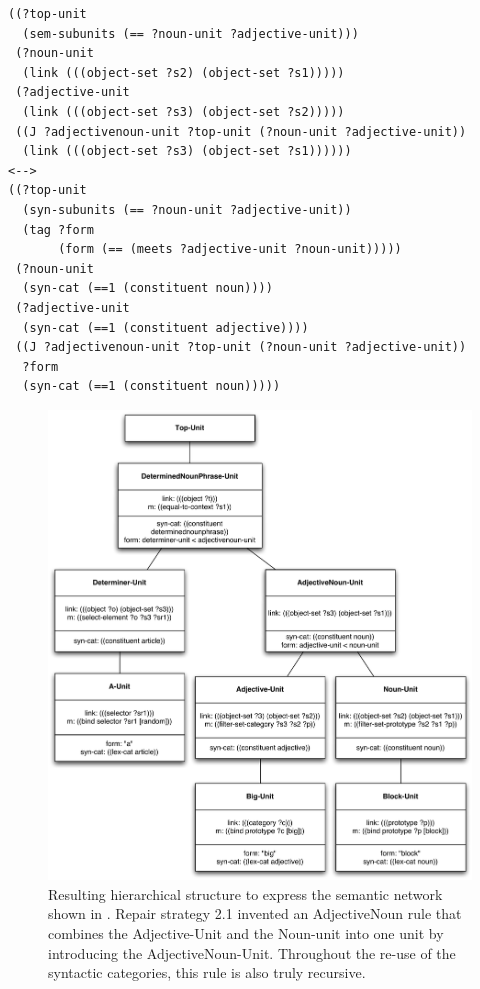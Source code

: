 \footnotesize
{}
\begin{lstlisting}
((?top-unit 
  (sem-subunits (== ?noun-unit ?adjective-unit)))
 (?noun-unit 
  (link (((object-set ?s2) (object-set ?s1)))))
 (?adjective-unit 
  (link (((object-set ?s3) (object-set ?s2)))))
 ((J ?adjectivenoun-unit ?top-unit (?noun-unit ?adjective-unit))
  (link (((object-set ?s3) (object-set ?s1))))))
<-->
((?top-unit
  (syn-subunits (== ?noun-unit ?adjective-unit))
  (tag ?form 
       (form (== (meets ?adjective-unit ?noun-unit)))))
 (?noun-unit
  (syn-cat (==1 (constituent noun))))
 (?adjective-unit 
  (syn-cat (==1 (constituent adjective))))
 ((J ?adjectivenoun-unit ?top-unit (?noun-unit ?adjective-unit))
  ?form
  (syn-cat (==1 (constituent noun)))))
\end{lstlisting}
\normalsize

\begin{figure}[htbp]
  \begin{center}
    \includegraphics[width=\textwidth]{./composition/figures/learning-3.pdf}
    \caption[Third resulting linguistic structure to express semantic
    constraint networks which is hierarchical]{Resulting hierarchical structure
      to express the semantic network shown in . Repair strategy 2.1 invented an
      AdjectiveNoun rule that combines the Adjective-Unit and the
      Noun-unit into one unit by introducing the
      AdjectiveNoun-Unit. Throughout the re-use of the syntactic
      categories, this rule is also truly recursive.}
    \label{f:map-structure-3}
  \end{center}
\end{figure}

